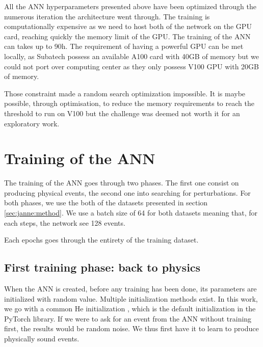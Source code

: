 \documentclass[../main.tex]{subfiles}
\begin{document}
All the ANN hyperparameters presented above have been optimized through the numerous iteration the architecture went through. The training is computationally expensive as we need to host both of the network on the GPU card, reaching quickly the memory limit of the GPU. The training of the ANN can takes up to 90h. The requirement of having a powerful GPU can be met locally, as Subatech possess an available A100 \cite{noauthor_nvidia_nodate-1} card with 40GB of memory but we could not port over computing center as they only possess V100 \cite{noauthor_nvidia_nodate-2} GPU with 20GB of memory.

Those constraint made a random search optimization impossible. It is maybe possible, through optimisation, to reduce the memory requirements to reach the threshold to run on V100 but the challenge was deemed not worth it for an exploratory work.

\section{Training of the ANN}
\label{sec:janne:arch:training}

The training of the ANN goes through two phases. The first one consist on producing physical events, the second one into searching for perturbations. For both phases, we use the both of the datasets presented in section \ref{sec:janne:method}. We use a batch size of 64 for both datasets meaning that, for each steps, the network see 128 events.

Each epochs goes through the entirety of the training dataset.

\subsection{First training phase: back to physics}
\label{sec:janne:results:identity}

When the ANN is created, before any training has been done, its parameters are initialized with random value. Multiple initialization methods exist. In this work, we go with a common He initialization \cite{he_delving_2015}, which is the default initialization in the PyTorch \cite{ansel_pytorch_2024} library. If we were to ask for an event from the ANN without training first, the results would be random noise. We thus first have it to learn to produce physically sound events.
\end{document}
